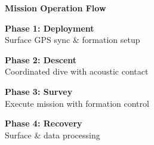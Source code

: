 
\begin{center}
\textbf{\large Mission Operation Flow}
\end{center}

\begin{tcolorbox}[colback=waspblue!10, colframe=waspblue, boxrule=0.5pt]
\textbf{Phase 1: Deployment} \\
Surface GPS sync \& formation setup
\end{tcolorbox}

\vspace{0.1em}

\begin{tcolorbox}[colback=waspgrey!10, colframe=waspgrey, boxrule=0.5pt]
\textbf{Phase 2: Descent} \\
Coordinated dive with acoustic contact
\end{tcolorbox}

\vspace{0.1em}

\begin{tcolorbox}[colback=wasppink!10, colframe=wasppink, boxrule=0.5pt]
\textbf{Phase 3: Survey} \\
Execute mission with formation control
\end{tcolorbox}

\vspace{0.1em}

\begin{tcolorbox}[colback=darkgreen!10, colframe=darkgreen, boxrule=0.5pt]
\textbf{Phase 4: Recovery} \\
Surface \& data processing
\end{tcolorbox}
